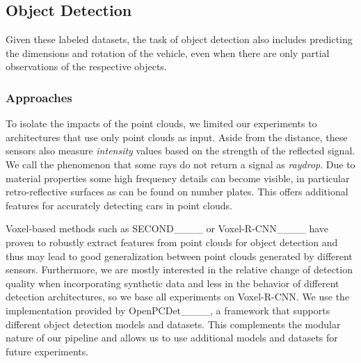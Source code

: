 \subsection{Object Detection}
Given these labeled datasets, the task of object detection also includes predicting the dimensions and rotation of the vehicle, even when there are only partial observations of the respective objects. 
\subsubsection{Approaches}
To isolate the impacts of the point clouds, we limited our experiments to architectures that use only \li point clouds as input.
Aside from the distance, these sensors also measure \emph{intensity} values based on the strength of the reflected signal.
We call the phenomenon that some rays do not return a signal as \emph{raydrop}.
Due to material properties some high frequency details can become visible, in particular retro-reflective surfaces as can be found on number plates.
This offers additional features for accurately detecting cars in point clouds.

Voxel-based methods such as SECOND____ or Voxel-R-CNN____ have proven to robustly extract features from point clouds for object detection and thus may lead to good generalization between point clouds generated by different sensors.
Furthermore, we are mostly interested in the relative change of detection quality when incorporating synthetic data and less in the behavior of different detection architectures, so we base all experiments on Voxel-R-CNN.
We use the implementation provided by OpenPCDet____, a framework that supports different object detection models and datasets. 
This complements the modular nature of our pipeline and allows us to use additional models and datasets for future experiments.

